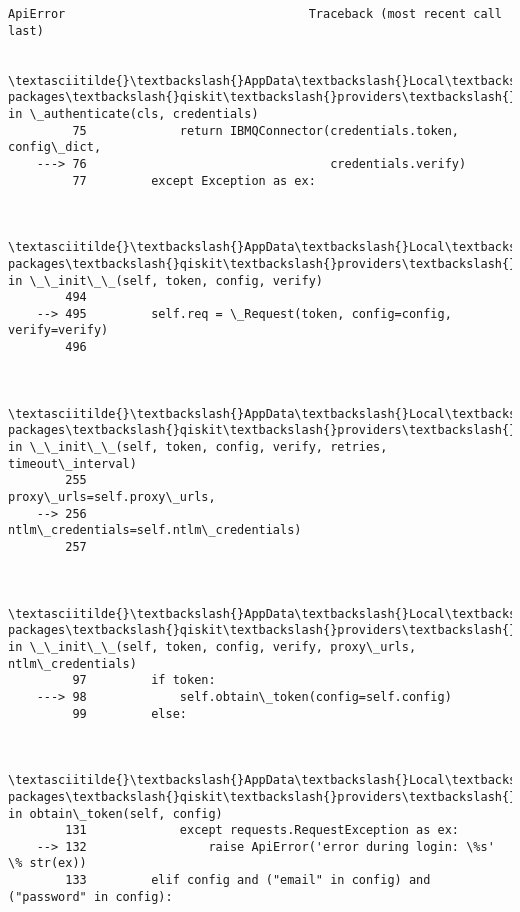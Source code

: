 \documentclass[11pt]{article}
\begin{document}
\begin{Verbatim}[commandchars=\\\{\}]
        ApiError                                  Traceback (most recent call last)

        \textasciitilde{}\textbackslash{}AppData\textbackslash{}Local\textbackslash{}Continuum\textbackslash{}anaconda3\textbackslash{}lib\textbackslash{}site-packages\textbackslash{}qiskit\textbackslash{}providers\textbackslash{}ibmq\textbackslash{}ibmqsingleprovider.py in \_authenticate(cls, credentials)
         75             return IBMQConnector(credentials.token, config\_dict,
    ---> 76                                  credentials.verify)
         77         except Exception as ex:
    

        \textasciitilde{}\textbackslash{}AppData\textbackslash{}Local\textbackslash{}Continuum\textbackslash{}anaconda3\textbackslash{}lib\textbackslash{}site-packages\textbackslash{}qiskit\textbackslash{}providers\textbackslash{}ibmq\textbackslash{}api\textbackslash{}ibmqconnector.py in \_\_init\_\_(self, token, config, verify)
        494 
    --> 495         self.req = \_Request(token, config=config, verify=verify)
        496 
    

        \textasciitilde{}\textbackslash{}AppData\textbackslash{}Local\textbackslash{}Continuum\textbackslash{}anaconda3\textbackslash{}lib\textbackslash{}site-packages\textbackslash{}qiskit\textbackslash{}providers\textbackslash{}ibmq\textbackslash{}api\textbackslash{}ibmqconnector.py in \_\_init\_\_(self, token, config, verify, retries, timeout\_interval)
        255                                        proxy\_urls=self.proxy\_urls,
    --> 256                                        ntlm\_credentials=self.ntlm\_credentials)
        257 
    

        \textasciitilde{}\textbackslash{}AppData\textbackslash{}Local\textbackslash{}Continuum\textbackslash{}anaconda3\textbackslash{}lib\textbackslash{}site-packages\textbackslash{}qiskit\textbackslash{}providers\textbackslash{}ibmq\textbackslash{}api\textbackslash{}ibmqconnector.py in \_\_init\_\_(self, token, config, verify, proxy\_urls, ntlm\_credentials)
         97         if token:
    ---> 98             self.obtain\_token(config=self.config)
         99         else:
    

        \textasciitilde{}\textbackslash{}AppData\textbackslash{}Local\textbackslash{}Continuum\textbackslash{}anaconda3\textbackslash{}lib\textbackslash{}site-packages\textbackslash{}qiskit\textbackslash{}providers\textbackslash{}ibmq\textbackslash{}api\textbackslash{}ibmqconnector.py in obtain\_token(self, config)
        131             except requests.RequestException as ex:
    --> 132                 raise ApiError('error during login: \%s' \% str(ex))
        133         elif config and ("email" in config) and ("password" in config):
    


\end{Verbatim}
\end{document}
